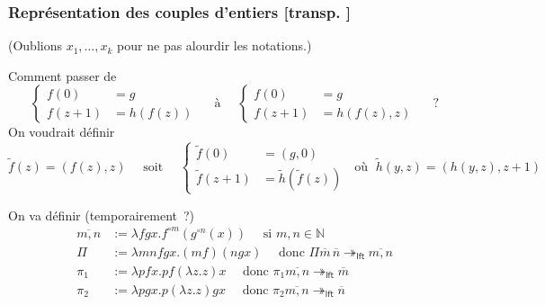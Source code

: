 \documentclass[mathserif,a4paper,aspectratio=169]{beamer}
\renewcommand{\frametitle}[1]{\subsubsection*{#1 {\footnotesize[transp. \insertframenumber]}}}
\begin{document}
\begin{frame}
\frametitle{Représentation des couples d'entiers}

{\footnotesize (Oublions $x_1,\ldots,x_k$ pour ne pas alourdir les
  notations.)\par}

Comment passer de
\[
\left\{
\begin{aligned}
f(0) &= g\\
f(z+1) &= h(f(z))
\end{aligned}
\right.
\quad\text{~à~}\quad
\left\{
\begin{aligned}
f(0) &= g\\
f(z+1) &= h(f(z),z)
\end{aligned}
\right.
\quad\text{~?}
\]
On voudrait définir
\[
\tilde f(z) = (f(z),z)
\quad\text{~soit~}\quad
\left\{
\begin{aligned}
\tilde f(0) &= (g,0)\\
\tilde f(z+1) &= \tilde h(\tilde f(z))
\end{aligned}
\right.
\;\text{~où~}\;
\tilde h(y,z) = (h(y,z), z+1)
\]

\bigskip

On va définir (temporairement ?)
\[
\begin{aligned}
\overline{m,n} &:= \lambda fgx.f^{\circ m}(g^{\circ n}(x))
\quad\text{~si~}m,n\in\mathbb{N}\\
\Pi &:= \lambda mnfgx.(mf)(ngx)
\quad\text{~donc~}\Pi\overline{m}\,\overline{n} \twoheadrightarrow_{\mathsf{lft}} \overline{m,n}\\
\pi_1 &:= \lambda pfx.pf(\lambda z.z)x
\quad\text{~donc~}\pi_1\overline{m,n} \twoheadrightarrow_{\mathsf{lft}} \overline{m}\\
\pi_2 &:= \lambda pgx.p(\lambda z.z)gx
\quad\text{~donc~}\pi_2\overline{m,n} \twoheadrightarrow_{\mathsf{lft}} \overline{n}\\
\end{aligned}
\]

\end{frame}
%
\end{document}
